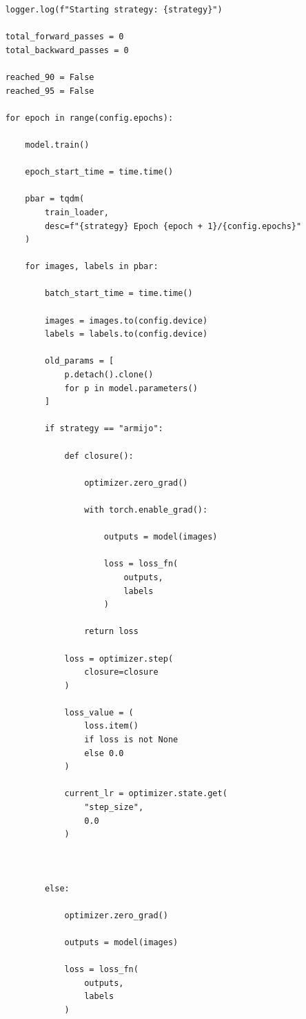 \begin{verbatim}
    logger.log(f"Starting strategy: {strategy}")

    total_forward_passes = 0
    total_backward_passes = 0

    reached_90 = False
    reached_95 = False

    for epoch in range(config.epochs):

        model.train()

        epoch_start_time = time.time()

        pbar = tqdm(
            train_loader,
            desc=f"{strategy} Epoch {epoch + 1}/{config.epochs}"
        )

        for images, labels in pbar:

            batch_start_time = time.time()

            images = images.to(config.device)
            labels = labels.to(config.device)

            old_params = [
                p.detach().clone()
                for p in model.parameters()
            ]

            if strategy == "armijo":

                def closure():

                    optimizer.zero_grad()

                    with torch.enable_grad():

                        outputs = model(images)

                        loss = loss_fn(
                            outputs,
                            labels
                        )

                    return loss

                loss = optimizer.step(
                    closure=closure
                )

                loss_value = (
                    loss.item()
                    if loss is not None
                    else 0.0
                )

                current_lr = optimizer.state.get(
                    "step_size",
                    0.0
                )

                

            else:

                optimizer.zero_grad()

                outputs = model(images)

                loss = loss_fn(
                    outputs,
                    labels
                )


\end{verbatim}
